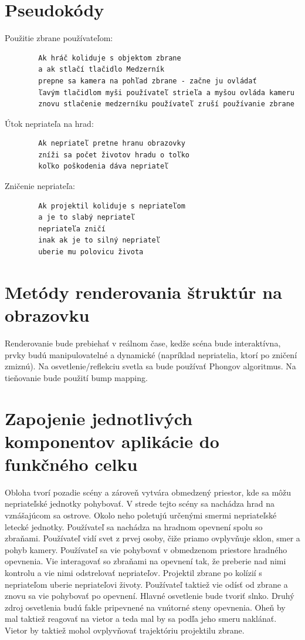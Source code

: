 \documentclass[12pt]{article}
\begin{document}
\section{Pseudokódy}\label{pseudocodes}
Použitie zbrane používateľom:
\begin{verbatim}
        Ak hráč koliduje s objektom zbrane 
        a ak stlačí tlačidlo Medzerník 
        prepne sa kamera na pohľad zbrane - začne ju ovládať 
        ľavým tlačidlom myši používateľ strieľa a myšou ovláda kameru
        znovu stlačenie medzerníku používateľ zruší používanie zbrane
\end{verbatim}
Útok nepriateľa na hrad:
\begin{verbatim}
        Ak nepriateľ pretne hranu obrazovky
        zníži sa počet životov hradu o toľko 
        koľko poškodenia dáva nepriateľ
\end{verbatim}
Zničenie nepriateľa:
\begin{verbatim}
        Ak projektil koliduje s nepriateľom
        a je to slabý nepriateľ
        nepriateľa zničí
        inak ak je to silný nepriateľ
        uberie mu polovicu života
\end{verbatim}

\section{Metódy renderovania štruktúr na obrazovku}\label{rendering}
Renderovanie bude prebiehať v reálnom čase, kedže scéna bude interaktívna, prvky budú 
manipulovatelné a dynamické (napríklad nepriatelia, ktorí po zničení zmiznú). Na 
osvetlenie/reflekciu svetla sa bude používať Phongov algoritmus. Na tieňovanie bude použití 
bump mapping.

\section{Zapojenie jednotlivých komponentov aplikácie do funkčného celku}\label{functioning unit}
Obloha tvorí pozadie scény a zároveň vytvára obmedzený priestor, kde sa môžu nepriateľské 
jednotky pohybovať. V strede tejto scény sa nachádza hrad na vznášajúcom sa ostrove. Okolo 
neho poletujú určenými smermi nepriateľské letecké jednotky. Používateľ sa nachádza na hradnom 
opevnení spolu so zbraňami. Používateľ vidí svet z prvej osoby, čiže priamo ovplyvňuje 
sklon, smer a pohyb kamery. Používateľ sa vie pohybovať v obmedzenom priestore hradného 
opevnenia. Vie interagovať so zbraňami na opevnení tak, že preberie nad nimi kontrolu a 
vie nimi odstrelovať nepriateľov. Projektil zbrane po kolízií s nepriateľom uberie nepriateľovi 
životy. Používateľ taktiež vie odísť od zbrane a znovu sa vie 
pohybovať po opevnení. Hlavné osvetlenie bude tvoriť slnko. Druhý zdroj osvetlenia budú 
fakle pripevnené na vnútorné steny opevnenia. Oheň by mal taktiež reagovať na vietor a 
teda mal by sa podľa jeho smeru naklánať. Vietor by taktiež mohol ovplyvňovať trajektóriu 
projektilu zbrane.
\end{document}

